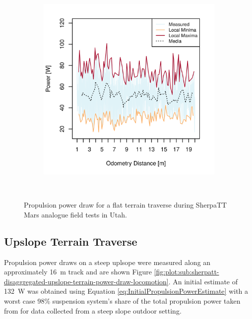 \begin{figure}[h]
\begin{subfigure}[t]{\subfigureWidth}
        \label{fig:plot:sub:sherpatt-flat-terrain-power-draw-1}
    \end{subfigure}\hfill
    \begin{subfigure}[t]{\subfigureWidth}
        \centering
        \includegraphics[height=\graphicsHeight]{sections/locomotion-power-draws/plots/locomotion-power-draw-on-flat-terrain-2.png}
		\label{fig:plot:sub:sherpatt-flat-terrain-power-draw-2}
	\end{subfigure}\\[0.8ex]
    \caption[Propulsion power draw for a flat terrain traverse during SherpaTT Mars analogue field tests in Utah]
            {Propulsion power draw for a flat terrain traverse during SherpaTT Mars analogue field tests in Utah.}
    \label{fig:plot:sherpatt-flat-terrain-power-draw}
\vspace{-2ex}
\end{figure}





\pagebreak
\subsection{Upslope Terrain Traverse}
\label{sec:PowerBudget:PropulsionPowerBudget:UpslopeTerrainTraverse}
Propulsion power draws on a steep uplsope were measured along an approximately \SI{16}{\meter} track and are shown Figure \ref{fig:plot:sub:sherpatt-disaggregated-upslope-terrain-power-draw-locomotion}. An initial estimate of \SI{132}{\watt} was obtained using Equation \ref{eq:InitialPropulsionPowerEstimate} with a worst case 98\% suspension system's share of the total propulsion power taken from  for data collected from a steep slope outdoor setting.

